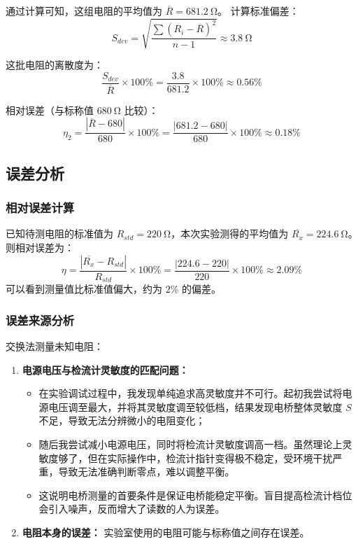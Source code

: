 \documentclass{../../templates/Report}%
\begin{document}
\begin{fullreportonly}
    通过计算可知，这组电阻的平均值为 $\overline{R} = \SI{681.2}{\ohm}$。
    计算标准偏差：
    \[S_{dev} = \sqrt{\frac{\sum(R_{i} - \overline{R})^2}{n-1}} \approx \SI{3.8}{\ohm}\]

    这批电阻的离散度为：
    \[\frac{S_{dev}}{\overline{R}} \times 100\% = \frac{3.8}{681.2} \times 100\% \approx 0.56\% \]

    相对误差（与标称值 $\SI{680}{\ohm}$ 比较）：
    \[ \eta_2 = \frac{|\overline{R} - 680|}{680} \times 100\% = \frac{|681.2 - 680|}{680} \times 100\% \approx 0.18\% \]

    \subsection{误差分析}
    \subsubsection{相对误差计算}
    已知待测电阻的标准值为 $R_{std} = \SI{220}{\ohm}$，本次实验测得的平均值为 $\overline{R_x} = \SI{224.6}{\ohm}$。
    则相对误差为：
    \[ \eta = \frac{|\overline{R_x} - R_{std}|}{R_{std}} \times 100\% = \frac{|224.6 - 220|}{220} \times 100\% \approx 2.09\% \]
    可以看到测量值比标准值偏大，约为 $2\%$ 的偏差。

    \subsubsection{误差来源分析}
    交换法测量未知电阻：
    \begin{enumerate}
        \item \textbf{电源电压与检流计灵敏度的匹配问题：}
              \begin{itemize}
                  \item 在实验调试过程中，我发现单纯追求高灵敏度并不可行。起初我尝试将电源电压调至最大，并将其灵敏度调至较低档，结果发现电桥整体灵敏度 $S$ 不足，导致无法分辨微小的电阻变化；
                  \item 随后我尝试减小电源电压，同时将检流计灵敏度调高一档。虽然理论上灵敏度够了，但在实际操作中，检流计指针变得极不稳定，受环境干扰严重，导致无法准确判断零点，难以调整平衡。
                  \item 这说明电桥测量的首要条件是保证电桥能稳定平衡。盲目提高检流计档位会引入噪声，反而增大了读数的人为误差。
              \end{itemize}

        \item \textbf{电阻本身的误差：}
              实验室使用的电阻可能与标称值之间存在误差。


\end{enumerate}
\end{fullreportonly}
\end{document}
